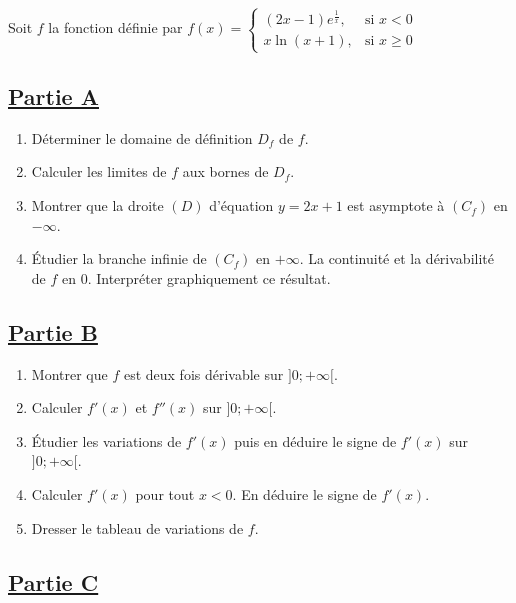 \documentclass[12pt,a4paper]{article}
\begin{document}
\section*{}

Soit \( f \) la fonction définie par
\( f(x) =
\begin{cases}
    (2x - 1) e^{\frac{1}{x}}, & \text{si } x < 0    \\
    x \ln(x+1),               & \text{si } x \geq 0
\end{cases} \)

\subsection*{\underline{\textbf{Partie A}}}

\begin{enumerate}
    \item Déterminer le domaine de définition \( D_f \) de \( f \).
    \item Calculer les limites de \( f \) aux bornes de \( D_f \).
    \item Montrer que la droite \( (D) \) d’équation \( y = 2x + 1 \) est asymptote à \( (C_f) \) en \( -\infty \).
    \item Étudier la branche infinie de \( (C_f) \) en \( +\infty \). La continuité et la dérivabilité de \( f \) en 0. Interpréter graphiquement ce résultat.
\end{enumerate}

\subsection*{\underline{\textbf{Partie B}}}

\begin{enumerate}
    \item Montrer que \( f \) est deux fois dérivable sur \( ]0; +\infty[ \).
    \item Calculer \( f'(x) \) et \( f''(x) \) sur \( ]0; +\infty[ \).
    \item Étudier les variations de \( f'(x) \) puis en déduire le signe de \( f'(x) \) sur \( ]0; +\infty[ \).
    \item Calculer \( f'(x) \) pour tout \( x < 0 \). En déduire le signe de \( f'(x) \).
    \item Dresser le tableau de variations de \( f \).
\end{enumerate}

\subsection*{\underline{\textbf{Partie C}}}
\end{document}
